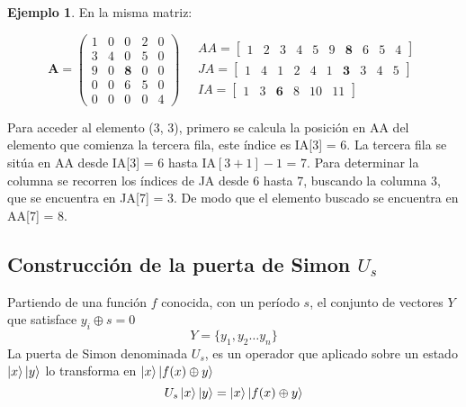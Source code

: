 \documentclass{article}
\newcommand*\mat[1]{ \begin{pmatrix} #1 \end{pmatrix}}
\newcommand*\arr[1]{ \begin{bmatrix} #1 \end{bmatrix}}
\theoremstyle{definition}
\newtheorem{ejemplo}{Ejemplo}[section]
\begin{document}
\begin{ejemplo} En la misma matriz:

$$ \textbf{A} = \mat{
	1 & 0 & 0 & 2 & 0 \\
	3 & 4 & 0 & 5 & 0 \\
	9 & 0 & \textbf{8} & 0 & 0 \\
	0 & 0 & 6 & 5 & 0 \\
	0 & 0 & 0 & 0 & 4 }
\quad
\begin{aligned}
	AA = \arr{ 1 & 2 & 3 & 4 & 5  & 9 & \textbf{8} & 6 & 5 & 4} \\
	JA = \arr{ 1 & 4 & 1 & 2 & 4  & 1 & \textbf{3} & 3 & 4 & 5}\\
	IA = \arr{ 1 & 3 & \textbf{6} & 8 & 10 & 11}
\end{aligned}
$$

Para acceder al elemento (3, 3), primero se calcula la posición en AA del 
elemento que comienza la tercera fila, este índice es IA[3] = 6. La tercera fila 
se sitúa en AA desde IA[3] = 6 hasta IA$[3+1]-1$ = 7.  Para determinar la 
columna se recorren los índices de JA desde 6 hasta 7, buscando la columna 3, 
que se encuentra en JA[7] = 3. De modo que el elemento buscado se encuentra en 
AA[7] = 8.

\end{ejemplo}

\subsection{Construcción de la puerta de Simon $U_s$}

Partiendo de una función $f$ conocida, con un período $s$, el conjunto de 
vectores $Y$ que satisface $y_i \oplus s = 0$
$$Y = \{ y_1, y_2 \ldots y_n \}$$
La puerta de Simon denominada $U_s$, es un operador que aplicado sobre un estado 
$\ket{x}\ket{y}$ lo transforma en $\ket{x}\ket{f(x) \oplus y}$
\begin{equation}
\label{Us_def} U_s\ket{x} \ket{y} = \ket{x} \ket{f(x) \oplus y}
\end{equation}
%
%
%

\end{document}

